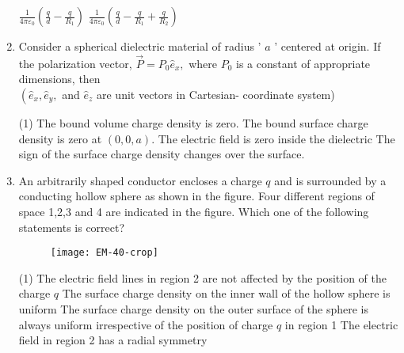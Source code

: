 \begin{enumerate}[label=\color{ocre}\textbf{\arabic*.}]
\begin{tasks}
		\task[\textbf{c.}] $\frac{1}{4 \pi \varepsilon_{0}}\left(\frac{q}{d}-\frac{q}{R_{1}}\right)$
		\task[\textbf{d.}] $\frac{1}{4 \pi \varepsilon_{0}}\left(\frac{q}{d}-\frac{q}{R_{1}}+\frac{q}{R_{2}}\right)$
	\end{tasks}
\item   Consider a spherical dielectric material of radius ' $a$ ' centered at origin. If the polarization vector, $\vec{P}=P_{0} \hat{e}_{x},$ where $P_{0}$ is a constant of appropriate dimensions, then\\ $\left(\hat{e}_{x}, \hat{e}_{y},\right.$ and $\hat{e}_{z}$ are unit vectors in Cartesian- coordinate system){}
\begin{tasks}(1)
	\task[\textbf{a.}] The bound volume charge density is zero.
	\task[\textbf{b.}] The bound surface charge density is zero at $(0,0, a)$.
	\task[\textbf{c.}] The electric field is zero inside the dielectric
	\task[\textbf{d.}] The sign of the surface charge density changes over the surface.
\end{tasks}
	\item An arbitrarily shaped conductor encloses a charge $q$ and is surrounded by a conducting hollow sphere as shown in the figure. Four different regions of space 1,2,3 and 4 are indicated in the figure. Which one of the following statements is correct? {}
	\begin{figure}[H]
		\begin{center}
			\texttt{[image: EM-40-crop]}
		\end{center}
	\end{figure}
	\begin{tasks}(1)
		\task[\textbf{a.}] The electric field lines in region 2 are not affected by the position of the charge $q$
		\task[\textbf{b.}] The surface charge density on the inner wall of the hollow sphere is uniform
		\task[\textbf{c.}] The surface charge density on the outer surface of the sphere is always uniform irrespective of the position of charge $q$ in region 1
		\task[\textbf{d.}] The electric field in region 2 has a radial symmetry
	\end{tasks}
	
	


\end{enumerate}
